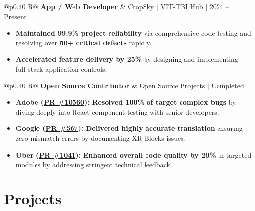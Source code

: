 \documentclass[a4paper,11pt]{article}
\newcommand{\subheading}[1]{\textbf{#1}}
\newcommand{\meta}[1]{{\fontsize{10}{12}\selectfont\textcolor[HTML]{3A3A3A}{#1}}}
\newcommand{\ulink}[2]{\href{#1}{#2}}
\begin{document}
\begin{tabularx}{\linewidth}{@{}p{0.40\linewidth} R@{}}
\subheading{App / Web Developer} & \meta{\ulink{https://sites.google.com/view/cropsky/home}{CropSky} $|$ VIT-TBI Hub $|$ 2024 -- Present}
\end{tabularx}
\begin{itemize}[nosep, leftmargin=1.5em, itemsep=2pt, topsep=2pt]
  \item {\color[HTML]{0A0A0A}\fontsize{11}{14}\selectfont \textbf{Maintained 99.9\% project reliability} via comprehensive code testing and resolving over \textbf{50+ critical defects} rapidly.}
  \item {\color[HTML]{0A0A0A}\fontsize{11}{14}\selectfont \textbf{Accelerated feature delivery by 25\%} by designing and implementing full-stack application controls.}
\end{itemize}

\begin{tabularx}{\linewidth}{@{}p{0.40\linewidth} R@{}}
\subheading{Open Source Contributor} & \meta{\ulink{https://github.com/su-jin1425/My-Open-Source-Contributions}{Open Source Projects} $|$ Completed}
\end{tabularx}
\begin{itemize}[nosep, leftmargin=1.5em, itemsep=2pt, topsep=2pt]
  \item {\color[HTML]{0A0A0A}\fontsize{11}{14}\selectfont \textbf{Adobe (\ulink{https://github.com/adobe/react-spectrum/pull/10560}{PR \#10560}):} \textbf{Resolved 100\% of target complex bugs} by diving deeply into React component testing with senior developers.}
  \item {\color[HTML]{0A0A0A}\fontsize{11}{14}\selectfont \textbf{Google (\ulink{https://github.com/google/xrblocks/pull/567}{PR \#567}):} \textbf{Delivered highly accurate translation} ensuring zero mismatch errors by documenting XR Blocks issues.}
  \item {\color[HTML]{0A0A0A}\fontsize{11}{14}\selectfont \textbf{Uber (\ulink{https://github.com/uber/causalml/pull/1041}{PR \#1041}):} \textbf{Enhanced overall code quality by 20\%} in targeted modules by addressing stringent technical feedback.}
\end{itemize}

\section{Projects}
\vspace{2pt}
\end{document}
